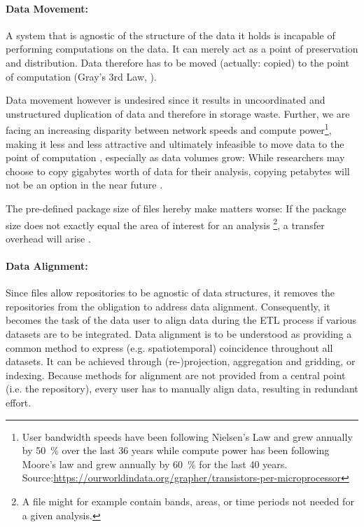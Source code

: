 \documentclass[letterpaper, parskip=half]{scrartcl}
\begin{document}
\paragraph{Data Movement:}
A system that is agnostic of the structure of the data it holds is incapable of performing computations on the data. 
It can merely act as a point of preservation and distribution. Data therefore has to be moved (actually: copied) to the point of computation (Gray's 3rd Law, \cite{Szalay2009}).

Data movement however is undesired since it results in uncoordinated and unstructured duplication of data and therefore in storage waste.
Further, we are facing an increasing disparity between network speeds and compute power\footnote{User bandwidth speeds have been following Nielsen's Law \citep{Nielsen1998} and grew annually by \SI{50}{\percent} over the last 36 years while compute power has been following Moore's law \citep{Moore1975} and grew annually by \SI{60}{\percent} for the last 40 years. Source:\url{https://ourworldindata.org/grapher/transistors-per-microprocessor}}, making it less and less attractive and ultimately infeasible to move data to the point of computation \citep{Hey2009}, especially as data volumes grow: While researchers may choose to copy gigabytes worth of data for their analysis, copying petabytes will not be an option in the near future \citep{Szalay2006}.

The pre-defined package size of files hereby make matters worse: If the package size does not exactly equal the area of interest for an analysis \footnote{A file might for example contain bands, areas, or time periods not needed for a given analysis.}, a transfer overhead will arise \citep{Gray2002}.

\paragraph{Data Alignment:}
Since files allow repositories to be agnostic of data structures, it removes the repositories from the obligation to address data alignment.
Consequently, it becomes the task of the data user to align data during the \gls{ETL} process if various datasets are to be integrated.
Data alignment is to be understood as providing a common method to express (e.g. spatiotemporal) coincidence throughout all datasets.
It can be achieved through (re-)projection, aggregation and gridding, or indexing.
Because methods for alignment are not provided from a central point (i.e. the repository), every user has to manually align data, resulting in redundant effort.
\end{document}
